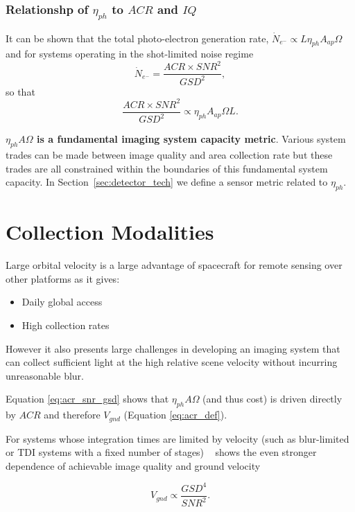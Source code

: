 \documentclass[10pt,journal]{IEEEtran}  %
\begin{document}
\subsubsection{Relationshp of $\eta_{ph}$ to $ACR$ and $IQ$}

It can be shown that the total photo-electron generation rate, $\dot{N}_{e^-} \propto L\eta_{ph}A_{ap}\Omega$ and for systems operating in the shot-limited noise regime
\begin{equation}
    \dot{N}_{e^-} = \frac{ACR \times SNR^2}{GSD^2},
\end{equation}
so that
\begin{equation}
\label{eq:acr_snr_gsd}
    \frac{ACR \times SNR^2}{GSD^2} \propto \eta_{ph} A_{ap}\Omega L.
\end{equation}

\textbf{$\eta_{ph} A \Omega$ is a fundamental imaging system capacity metric}.  Various system trades can be made between image quality and area collection rate but these trades are all constrained within the boundaries of this fundamental system capacity.  In Section~\ref{sec:detector_tech} we define a sensor metric related to $\eta_{ph}$.

\section{Collection Modalities}
\label{sec:modalities}
Large orbital velocity is a large advantage of spacecraft for remote sensing over other platforms as it gives:

\begin{itemize}
\item Daily global access
\item High collection rates
\end{itemize}

However it also presents large challenges in developing an imaging system that can collect sufficient light at the high relative scene velocity without incurring unreasonable blur.

Equation \eqref{eq:acr_snr_gsd} shows that $\eta_{ph} A \Omega$ (and thus cost) is driven directly by $ACR$ and therefore $V_{gnd}$ (Equation \eqref{eq:acr_def}).

For systems whose integration times are limited by velocity (such as blur-limited or TDI systems with a fixed number of stages) ~\cite{shaw} shows the   even stronger dependence of achievable image quality and ground velocity

\begin{equation*}
V_{gnd} \propto \frac{GSD^4}{SNR^2}.
\end{equation*}
\end{document}
